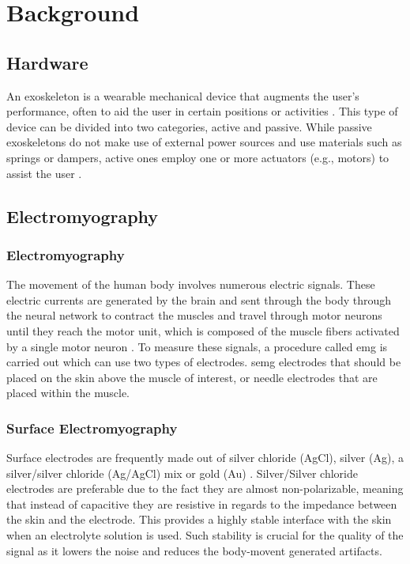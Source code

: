 \section{Background}
\label{section:background}

\subsection{Hardware}

An exoskeleton is a wearable mechanical device that augments the user's performance, often to aid the user in certain positions or activities \cite{exodefinition}. This type of device can be divided into two
categories, active and passive. While passive exoskeletons do not make use of external power sources and use materials
such as springs or dampers, active ones employ one or more actuators (e.g., motors) to assist the user \cite{passiveactiveexo}.


\subsection{Electromyography}

\subsubsection{Electromyography}

The movement of the human body involves numerous electric signals. These electric currents are generated by the brain and sent through the body through the neural network
to contract the muscles and travel through motor neurons until they reach the motor unit, which is composed of the muscle fibers
activated by a single motor neuron \cite{emggen}. To measure these signals, a procedure called \acrfull{emg} is carried out which can use two types of electrodes. \acrfull{semg} 
electrodes that should be placed on the skin above the muscle of interest, or needle electrodes that are placed within the muscle. 

\subsubsection{Surface Electromyography}

Surface electrodes are frequently made out of silver chloride (AgCl), silver (Ag), a silver/silver chloride (Ag/AgCl) mix or gold (Au) \cite{sEMG}.
Silver/Silver chloride electrodes are preferable due to the fact they are almost non-polarizable, meaning that instead of capacitive
they are resistive in regards to the impedance between the skin and the electrode. This provides a highly stable interface with the skin when 
an electrolyte solution is used. Such stability is crucial for the quality of the signal as it lowers the noise and reduces the body-movent generated
artifacts.

